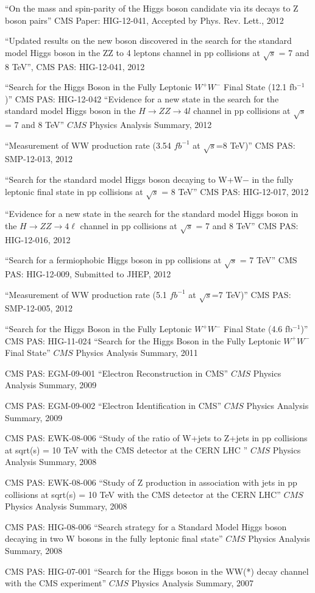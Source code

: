  ``On the mass and spin-parity of the Higgs boson candidate via its decays to Z boson pairs''
CMS Paper: HIG-12-041, Accepted by Phys. Rev. Lett., 2012

 ``Updated results on the new boson discovered in the search for the standard model Higgs boson in the ZZ to 4 leptons channel in pp collisions at $\sqrt{s}$ = 7 and 8 TeV'', 
CMS PAS: HIG-12-041, 2012

 ``Search for the Higgs Boson in the Fully Leptonic $W^+W^-$ Final State (12.1 fb$^{-1}$)''
CMS PAS: HIG-12-042 ``Evidence for a new state in the search for the standard model Higgs boson in the $H\to ZZ\to 4l$ channel in pp collisions at $\sqrt{s}$ = 7 and 8 TeV''
$CMS$ Physics Analysis Summary, 2012

 ``Measurement of WW production rate (3.54 $fb^{-1}$ at $\sqrt{s}$=8 TeV)''
CMS PAS: SMP-12-013, 2012

 ``Search for the standard model Higgs boson decaying to W+W− in the fully leptonic final state in pp collisions at $\sqrt{s}$ = 8 TeV''
CMS PAS: HIG-12-017, 2012

 ``Evidence for a new state in the search for the standard model Higgs boson in the $H \to ZZ \to 4\ell$ channel in pp collisions at $\sqrt{s}$ = 7 and 8 TeV''
CMS PAS: HIG-12-016, 2012

 ``Search for a fermiophobic Higgs boson in pp collisions at $\sqrt{s}$ = 7 TeV''
CMS PAS: HIG-12-009, Submitted to JHEP, 2012

 ``Measurement of WW production rate (5.1 $fb^{-1}$ at $\sqrt{s}$=7 TeV)''
CMS PAS: SMP-12-005, 2012

 ``Search for the Higgs Boson in the Fully Leptonic $W^+W^-$ Final State (4.6 fb$^{-1}$)''
CMS PAS: HIG-11-024 ``Search for the Higgs Boson in the Fully Leptonic $W^+W^-$ Final State''
$CMS$ Physics Analysis Summary, 2011

CMS PAS: EGM-09-001 ``Electron Reconstruction in CMS''
$CMS$ Physics Analysis Summary, 2009

CMS PAS: EGM-09-002 ``Electron Identification in CMS''
$CMS$ Physics Analysis Summary, 2009

CMS PAS: EWK-08-006 ``Study of the ratio of W+jets to Z+jets in pp collisions at sqrt(s) =  10 TeV with the CMS detector at the CERN LHC ''
$CMS$ Physics Analysis Summary, 2008

CMS PAS: EWK-08-006 ``Study of Z production in association with jets in pp collisions at sqrt(s) = 10 TeV with the CMS detector at the CERN LHC''
$CMS$ Physics Analysis Summary, 2008

CMS PAS: HIG-08-006 ``Search strategy for a Standard Model Higgs boson decaying in two W bosons in the fully leptonic final state''
$CMS$ Physics Analysis Summary, 2008

CMS PAS: HIG-07-001 ``Search for the Higgs boson in the WW(*) decay channel with the CMS experiment''
$CMS$ Physics Analysis Summary, 2007
